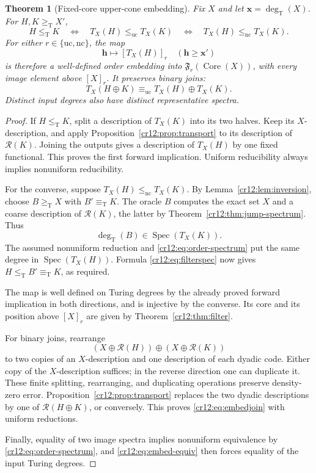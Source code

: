 \documentclass[11pt,letterpaper]{article}
\theoremstyle{plain}
\newtheorem{theorem}{Theorem}[section]
\theoremstyle{definition}
\theoremstyle{remark}
\numberwithin{equation}{section}
\newcommand{\leT}{\leq_{\mathrm T}}
\newcommand{\geT}{\geq_{\mathrm T}}
\newcommand{\eqT}{\equiv_{\mathrm T}}
\newcommand{\leuc}{\leq_{\mathrm{uc}}}
\newcommand{\lenc}{\leq_{\mathrm{nc}}}
\newcommand{\equc}{\equiv_{\mathrm{uc}}}
\newcommand{\Core}{\operatorname{Core}}
\newcommand{\Spec}{\operatorname{Spec}}
\newcommand{\degT}{\deg_{\mathrm T}}
\newcommand{\Rcode}{\mathcal R}
\newcommand{\fiber}{\mathfrak F}
\begin{document}
\begin{theorem}[Fixed-core upper-cone embedding]\label{cr12:thm:embedding}
Fix $X$ and let $\mathbf x=\degT(X)$. For $H,K\geT X'$,
\begin{equation}\label{cr12:eq:embed-equiv}
 H\leT K
 \quad\Longleftrightarrow\quad
 T_X(H)\leuc T_X(K)
 \quad\Longleftrightarrow\quad
 T_X(H)\lenc T_X(K).
\end{equation}
For either $r\in\{\mathrm{uc},\mathrm{nc}\}$, the map
\[
 \mathbf h\longmapsto[T_X(H)]_r
 \quad(\mathbf h\ge\mathbf x')
\]
is therefore a well-defined order embedding into $\fiber_r(\Core(X))$,
with every image element above $[X]_r$. It preserves binary joins:
\begin{equation}\label{cr12:eq:embedjoin}
 T_X(H\oplus K)\equc T_X(H)\oplus T_X(K).
\end{equation}
Distinct input degrees also have distinct representative spectra.
\end{theorem}
\begin{proof}
If $H\leT K$, split a description of $T_X(K)$ into its two halves. Keep its
$X$-description, and apply Proposition~\ref{cr12:prop:transport} to its description
of $\Rcode(K)$. Joining the outputs gives a description of $T_X(H)$ by one
fixed functional. This proves the first forward implication. Uniform
reducibility always implies nonuniform reducibility.

For the converse, suppose $T_X(H)\lenc T_X(K)$. By
Lemma~\ref{cr12:lem:inversion}, choose $B\geT X$ with $B'\eqT K$. The oracle $B$
computes the exact set $X$ and a coarse description of $\Rcode(K)$, the latter
by Theorem~\ref{cr12:thm:jump-spectrum}. Thus
\[
 \degT(B)\in\Spec(T_X(K)).
\]
The assumed nonuniform reduction and \eqref{cr12:eq:order-spectrum} put the same
degree in $\Spec(T_X(H))$. Formula \eqref{cr12:eq:filterspec} now gives
$H\leT B'\eqT K$, as required.

The map is well defined on Turing degrees by the already proved forward
implication in both directions, and is injective by the converse. Its core and
its position above $[X]_r$ are given by Theorem~\ref{cr12:thm:filter}.

For binary joins, rearrange
\[
 (X\oplus\Rcode(H))\oplus(X\oplus\Rcode(K))
\]
to two copies of an $X$-description and one description of each dyadic code.
Either copy of the $X$-description suffices; in the reverse direction one can
duplicate it. These finite splitting, rearranging, and duplicating operations
preserve density-zero error. Proposition~\ref{cr12:prop:transport} replaces the two
dyadic descriptions by one of $\Rcode(H\oplus K)$, or conversely.
This proves \eqref{cr12:eq:embedjoin} with uniform reductions.

Finally, equality of two image spectra implies nonuniform equivalence by
\eqref{cr12:eq:order-spectrum}, and \eqref{cr12:eq:embed-equiv} then forces equality of
the input Turing degrees.
\end{proof}
\end{document}
